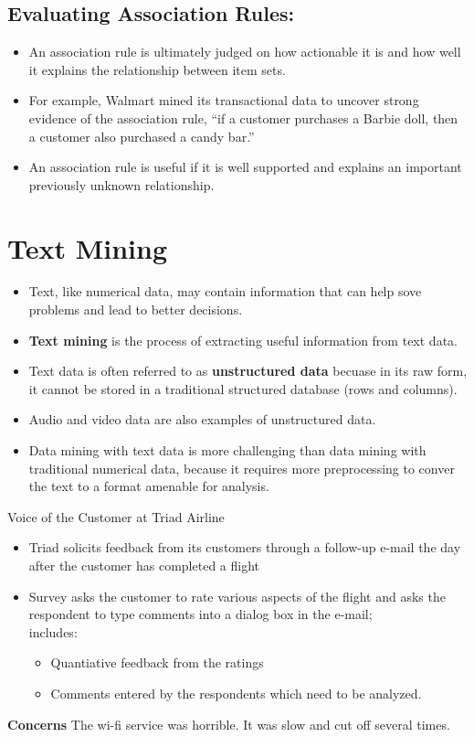 \documentclass{report}
\begin{document}
\subsection{Evaluating Association Rules:}
\begin{itemize}
  \item An association rule is ultimately judged on how actionable it is and how well it explains the relationship between item sets.
  \item For example, Walmart mined its transactional data to uncover strong evidence of the association rule, ``if a customer purchases a Barbie doll, then a customer also purchased a candy bar.''
  \item An association rule is useful if it is well supported and explains an important previously unknown relationship.
\end{itemize}
\section{Text Mining}
\begin{itemize}
  \item Text, like numerical data, may contain information that can help sove problems and lead to better decisions. 
  \item \textbf{Text mining} is the process of extracting useful information from text data.
  \item Text data is often referred to as \textbf{unstructured data} becuase in its raw form, it cannot be stored in a traditional structured database (rows and columns).
  \item Audio and video data are also examples of unstructured data.
    \item Data mining with text data is more challenging than data mining with traditional numerical data, because it requires more preprocessing to conver the text to a format amenable for analysis.
\end{itemize}
\bigbreak \noindent
\begin{large}{Voice of the Customer at Triad Airline}\end{large}
\begin{itemize}
  \item Triad solicits feedback from its customers through a follow-up e-mail the day after the customer has completed a flight 
  \item Survey asks the customer to rate various aspects of the flight and asks the respondent to type comments into a dialog box in the e-mail;\\ includes:
    \begin{itemize}[label=$\circ$]
      \item Quantiative feedback from the ratings 
      \item Comments entered by the respondents which need to be analyzed.
    \end{itemize}
\end{itemize}
\bigbreak \noindent
\textbf{Concerns}
\bigbreak \noindent
The wi-fi service was horrible. It was slow and cut off several times.
\vspace{2mm}
\end{document}
